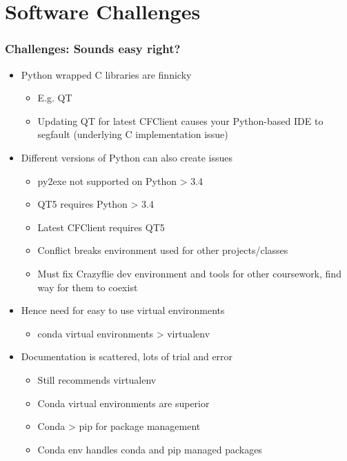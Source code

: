 \documentclass[t, xcolor=dvipsnames]{beamer} %
\begin{document}
\section{Software Challenges}
\begin{frame}
	\frametitle{Challenges: Sounds easy right?}
	\begin{itemize}
		\item Python wrapped C libraries are finnicky
			\begin{itemize}
				\item E.g. QT 
				\item Updating QT for latest CFClient causes your Python-based IDE to segfault (underlying C implementation issue)
			\end{itemize}
		\item Different versions of Python can also create issues
			\begin{itemize}
				\item py2exe not supported on Python > 3.4
				\item QT5 requires Python > 3.4
				\item Latest CFClient requires QT5
				\item Conflict breaks environment used for other projects/classes
				\item Must fix Crazyflie dev environment and tools for other coursework, find way for them to coexist
			\end{itemize}
		\item Hence need for easy to use virtual environments
			\begin{itemize}
				\item conda virtual environments > virtualenv
			\end{itemize}
		\item Documentation is scattered, lots of trial and error
			\begin{itemize}
				\item Still recommends virtualenv
				\item Conda virtual environments are superior
				\item Conda > pip for package management
				\item Conda env handles conda and pip managed packages
			\end{itemize}
	\end{itemize}
\end{frame}


%
\end{document}
